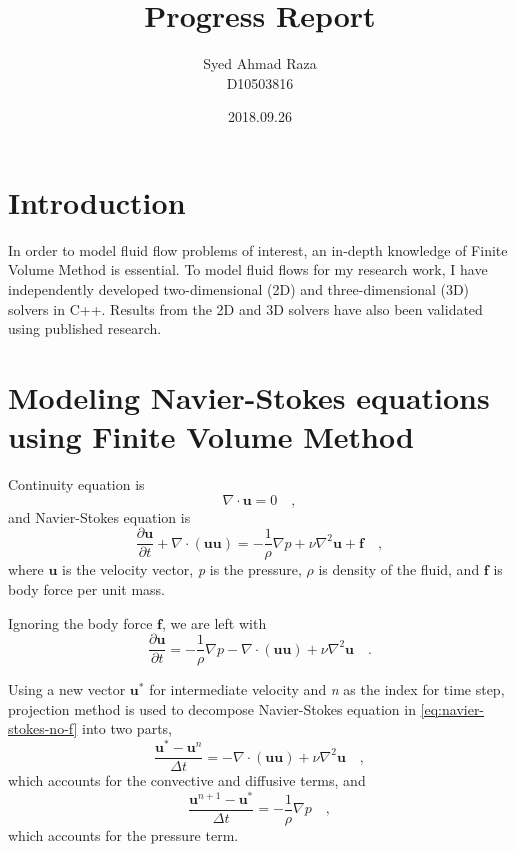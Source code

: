 \documentclass[12pt,a4paper,fleqn]{article}
\title{Progress Report}
\author{Syed Ahmad Raza\\
        D10503816}
\date{2018.09.26}
\begin{document}
\maketitle
\tableofcontents
\pagebreak

\section{Introduction}

In order to model fluid flow problems of interest, an in-depth knowledge of Finite Volume Method is essential. To model fluid flows for my research work, I have independently developed two-dimensional (2D) and three-dimensional (3D) solvers in C++. Results from the 2D and 3D solvers have also been validated using published research.

\section{Modeling Navier-Stokes equations using Finite Volume Method}

Continuity equation is
\begin{equation}\label{eq:continuity}
\nabla \cdot \mathbf{u} = 0 \quad,
\end{equation}
and Navier-Stokes equation is
\begin{equation}\label{eq:navier-stokes}
\frac{\partial \mathbf{u}}{\partial t}+\nabla \cdot (\mathbf{u}\mathbf{u}) = -\frac{1}{\rho}\nabla p + \nu \nabla^2 \mathbf{u}+\mathbf{f} \quad,
\end{equation}
where $\mathbf{u}$ is the velocity vector, \textit{p} is the pressure, $\rho$ is density of the fluid, and $\mathbf{f}$ is body force per unit mass.

Ignoring the body force $\mathbf{f}$, we are left with
\begin{equation}\label{eq:navier-stokes-no-f}
\frac {\partial \mathbf{u}}{\partial t} = -\frac{1}{\rho}\nabla p -\nabla \cdot (\mathbf{uu}) + \nu \nabla^2 \mathbf{u} \quad.
\end{equation}

Using a new vector $\mathbf{u}^*$ for intermediate velocity and \textit{n} as the index for time step, projection method is used to decompose Navier-Stokes equation in \eqref{eq:navier-stokes-no-f} into two parts,
\begin{equation}\label{eq:projection01}
\frac{\mathbf{u}^*-\mathbf{u}^n}{\Delta t} = -\nabla \cdot (\mathbf{u}\mathbf{u})+ \nu \nabla^2 \mathbf{u} \quad,
\end{equation}
which accounts for the convective and diffusive terms, and
\begin{equation}\label{eq:projection02}
\frac{\mathbf{u}^{n+1}-\mathbf{u}^*}{\Delta t}=-\frac{1}{\rho}\nabla p \quad,
\end{equation}
which accounts for the pressure term.
\end{document}
